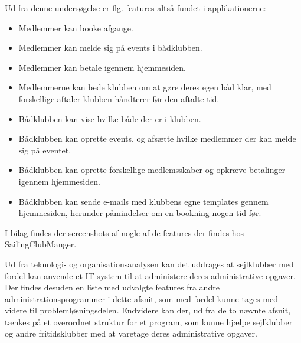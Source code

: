 Ud fra denne undersøgelse er flg. features altså fundet i applikationerne:

\begin{itemize}
	\item Medlemmer kan booke afgange.
	\item Medlemmer kan melde sig på events i bådklubben.
	\item Medlemmer kan betale igennem hjemmesiden.
	\item Medlemmerne kan bede klubben om at gøre deres egen båd klar, med forskellige aftaler klubben håndterer
        før den aftalte tid.
	\item Bådklubben kan vise hvilke både der er i klubben.
	\item Bådklubben kan oprette events, og afsætte hvilke medlemmer der kan melde sig på eventet.
	\item Bådklubben kan oprette forskellige medlemsskaber og opkræve betalinger igennem hjemmesiden.
	\item Bådklubben kan sende e-mails med klubbens egne templates gennem hjemmesiden, herunder påmindelser om en
        bookning nogen tid før.
\end{itemize}

I bilag  findes der screenshots af nogle af de features der findes hos SailingClubManger.

Ud fra teknologi- og organisationsanalysen kan det uddrages at sejlklubber med fordel kan anvende et IT-system til at administere deres administrative opgaver. Der findes desuden en liste med udvalgte features fra andre administrationsprogrammer i dette afsnit, som med fordel kunne tages med videre til problemløsningsdelen. 
Endvidere kan der, ud fra de to nævnte afsnit, tænkes på et overordnet struktur for et program, som kunne hjælpe sejlklubber og andre fritidsklubber med at varetage deres administrative opgaver.  
